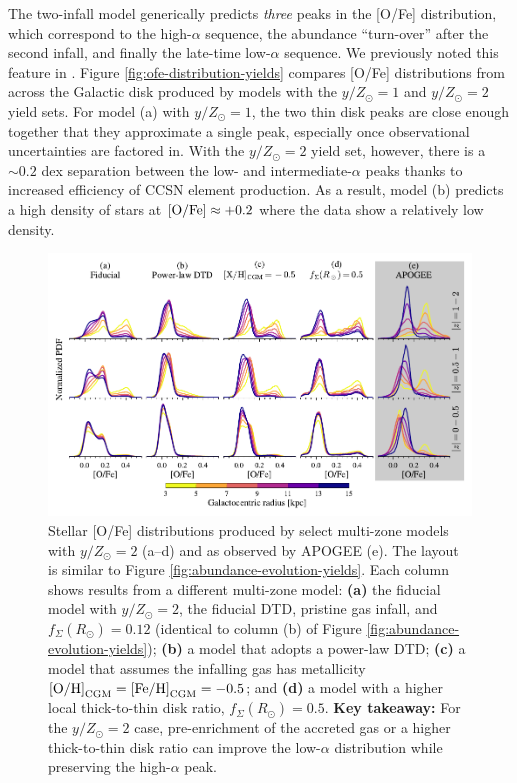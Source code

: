 \documentclass[twocolumn,twocolappendix,linenumbers]{aastex631}
\newcommand{\mathOH}{{\rm [O/H]}}
\newcommand{\mathFeH}{{\rm [Fe/H]}}
\newcommand{\mathOFe}{{\rm [O/Fe]}}
\newcommand{\yZ}[1]{$y/Z_\odot=#1$}
\begin{document}
The two-infall model generically predicts {\it three} peaks in the [O/Fe] distribution, which correspond to the high-$\alpha$ sequence, the abundance ``turn-over'' after the second infall, and finally the late-time low-$\alpha$ sequence. We previously noted this feature in \citet{dubay_galactic_2024}. Figure \ref{fig:ofe-distribution-yields} compares [O/Fe] distributions from across the Galactic disk produced by models with the \yZ{1} and \yZ{2} yield sets. For model (a) with $y/Z_\odot=1$, the two thin disk peaks are close enough together that they approximate a single peak, especially once observational uncertainties are factored in. With the \yZ{2} yield set, however, there is a $\sim0.2$ dex separation between the low- and intermediate-$\alpha$ peaks thanks to increased efficiency of CCSN element production. As a result, model (b) predicts a high density of stars at $\mathOFe\approx+0.2$ where the data show a relatively low density.

\begin{figure}
    \centering
    \includegraphics[width=\linewidth]{src/tex/figures/ofe_distribution_params.pdf}
    \caption{Stellar [O/Fe] distributions produced by select multi-zone models with \yZ{2} (a--d) and as observed by APOGEE (e). The layout is similar to Figure \ref{fig:abundance-evolution-yields}. Each column shows results from a different multi-zone model: {\bf (a)} the fiducial model with \yZ{2}, the fiducial DTD, pristine gas infall, and $f_\Sigma(R_\odot)=0.12$ (identical to column (b) of Figure \ref{fig:abundance-evolution-yields}); {\bf (b)} a model that adopts a power-law DTD; {\bf (c)} a model that assumes the infalling gas has metallicity $\mathOH_{\rm CGM}=\mathFeH_{\rm CGM}=-0.5$; and {\bf (d)} a model with a higher local thick-to-thin disk ratio, $f_\Sigma(R_\odot)=0.5$. {\bf Key takeaway:} For the \yZ{2} case, pre-enrichment of the accreted gas or a higher thick-to-thin disk ratio can improve the low-$\alpha$ distribution while preserving the high-$\alpha$ peak.}
    \label{fig:ofe-distribution-parameters}
\end{figure}
\end{document}
